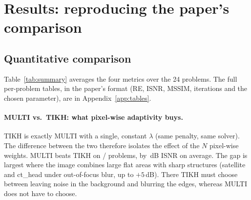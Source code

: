 \section{Results: reproducing the paper's comparison}
\label{sec:results}

\subsection{Quantitative comparison}
Table~\ref{tab:summary} averages the four metrics over the 24 problems.
The full per-problem tables, in the paper's format (RE, ISNR, MSSIM, iterations and
the chosen parameter), are in Appendix~\ref{app:tables}.

\begin{table}[t]
\centering\small
{}
\caption{Mean metrics over all problems. ``best ISNR/MSSIM'' counts the problems on
which a method is best among all six rows. MULTI-autoS is MULTI-auto with the
scale-aware $\epsilon$ of Sec.~\ref{sec:auto}; the Kodak rows are discussed in
Sec.~\ref{sec:kodak}. Times are medians in seconds, single-threaded,
for the final run only (parameter tuning is not included). MULTI-auto runs once with no
tuning, so its time is its entire cost, whereas the tuned methods need 10--20 runs each
to choose their parameter.}
\label{tab:summary}
\end{table}

\paragraph{MULTI vs.\ TIKH: what pixel-wise adaptivity buys.}
TIKH is exactly MULTI with a single, constant $\lambda$ (same penalty, same solver).
The difference between the two therefore isolates the effect of the
$N$ pixel-wise weights. MULTI beats TIKH on \nMainMultiBeatsTikh/\nMainN{} problems,
by \nMainMultiTikhGain\,dB ISNR on average. The gap is largest where the image
combines large flat areas with sharp structures (satellite and ct\_head under
out-of-focus blur, up to $+5$\,dB). There TIKH must choose between leaving noise
in the background and blurring the edges, whereas MULTI does not have to choose.

